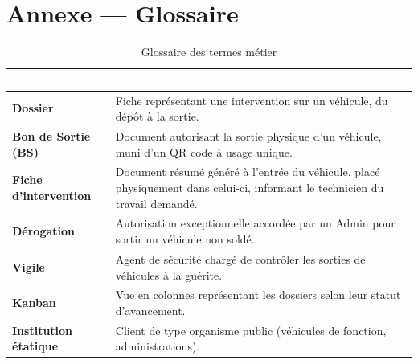\documentclass[11pt,a4paper]{report}
\begin{document}
\chapter{Annexe --- Glossaire}

\begin{table}[h!]
\centering
{}
\begin{tabularx}{\linewidth}{@{}l>{\raggedright\arraybackslash}X@{}}
\toprule
\rowcolor{km0blue}
\textcolor{white}{\textbf{Terme}} & \textcolor{white}{\textbf{Définition}} \\
\midrule
\textbf{Dossier} & Fiche représentant une intervention sur un véhicule, du dépôt à la sortie. \\
\textbf{Bon de Sortie (BS)} & Document autorisant la sortie physique d'un véhicule, muni d'un QR code à usage unique. \\
\textbf{Fiche d'intervention} & Document résumé généré à l'entrée du véhicule, placé physiquement dans celui-ci, informant le technicien du travail demandé. \\
\textbf{Dérogation} & Autorisation exceptionnelle accordée par un Admin pour sortir un véhicule non soldé. \\
\textbf{Vigile} & Agent de sécurité chargé de contrôler les sorties de véhicules à la guérite. \\
\textbf{Kanban} & Vue en colonnes représentant les dossiers selon leur statut d'avancement. \\
\textbf{Institution étatique} & Client de type organisme public (véhicules de fonction, administrations). \\
\bottomrule
\end{tabularx}
\caption{Glossaire des termes métier}
\end{table}
\end{document}
